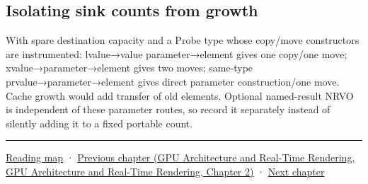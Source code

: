 \subsection{Isolating sink counts from growth}\label{01-foundations-i-ch010-isolating-sink-counts-from-growth}

With spare destination capacity and a Probe type whose copy/move constructors are instrumented: lvalue→value parameter→element gives one copy/one move; xvalue→parameter→element gives two moves; same-type prvalue→parameter→element gives direct parameter construction/one move. Cache growth would add transfer of old elements. Optional named-result NRVO is independent of these parameter routes, so record it separately instead of silently adding it to a fixed portable count.

\begin{center}\rule{0.5\linewidth}{0.5pt}\end{center}

\hyperref[volume-reading-map]{Reading map} · \href{../06-GPU-Architecture-and-Real-Time-Rendering/main.pdf\#nameddest=01-foundations-i-ch009-gpu-memory-divergence-atomics-and-ordering}{Previous chapter (GPU Architecture and Real-Time Rendering, GPU Architecture and Real-Time Rendering, Chapter 2)} · \hyperref[01-foundations-i-ch011-c-const-borrowing-and-cpugpu-buffering]{Next chapter}
